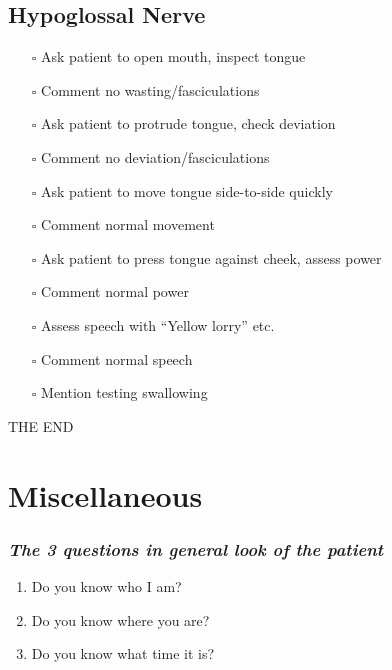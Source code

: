 \documentclass[
  13.5pt,
  a4paper,
  DIV=11,
  numbers=noendperiod]{scrreprt}
\providecommand{\tightlist}{%
  \setlength{\itemsep}{0pt}\setlength{\parskip}{0pt}}
\begin{document}
\section{Hypoglossal Nerve}\label{hypoglossal-nerve}

\begin{itemize}
\tightlist
\item[$\square$]
  Ask patient to open mouth, inspect tongue
\item[$\square$]
  Comment no wasting/fasciculations
\item[$\square$]
  Ask patient to protrude tongue, check deviation
\item[$\square$]
  Comment no deviation/fasciculations
\item[$\square$]
  Ask patient to move tongue side-to-side quickly
\item[$\square$]
  Comment normal movement
\item[$\square$]
  Ask patient to press tongue against cheek, assess power
\item[$\square$]
  Comment normal power
\item[$\square$]
  Assess speech with ``Yellow lorry'' etc.
\item[$\square$]
  Comment normal speech
\item[$\square$]
  Mention testing swallowing
\end{itemize}

THE END


\chapter{Miscellaneous}\label{miscellaneous}

\subsection{\texorpdfstring{\emph{The 3 questions in \textbf{general
look of the
patient}}}{The 3 questions in general look of the patient}}\label{the-3-questions-in-general-look-of-the-patient}

\begin{enumerate}
\def\labelenumi{\arabic{enumi}.}
\item
  Do you know who I am?
\item
  Do you know where you are?
\item
  Do you know what time it is?
\end{enumerate}
\end{document}
